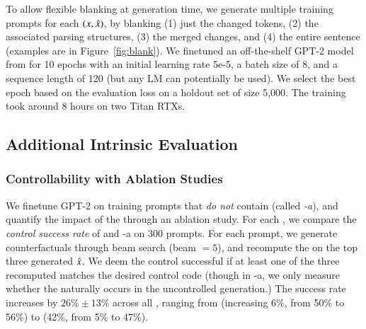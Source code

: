 To allow flexible blanking at generation time, we generate multiple training prompts for each $(x, \hat{x})$, by blanking (1) just the changed tokens, (2) the associated parsing structures, (3) the merged changes, and (4) the entire sentence (examples are in Figure~\ref{fig:blank}).
We finetuned an off-the-shelf GPT-2 model from \citet{Wolf2019HuggingFacesTS} for 10 epochs with an initial learning rate 5e-5, a batch size of 8, and a sequence length of 120 (but any LM can potentially be used).
We select the best epoch based on the evaluation loss on a holdout set of size 5,000.
The training took around 8 hours on two Titan RTXs.


\subsection{Additional Intrinsic Evaluation}
\label{appendix:intrinsic}

\subsubsection{Controllability with Ablation Studies}
\label{appendix:ablation_control}



We finetune GPT-2 on training prompts that \emph{do not} contain \tagstrs (called \emph{\sysname-a}), and quantify the impact of the \tagstrshorts through an ablation study.
For each \tagstr, we compare the \emph{control success rate} of \sysname and \sysname-a on 300 prompts.
For each prompt, we generate counterfactuals through beam search (beam $=5$), and recompute the \tagstrshorts on the top three generated $\hat{x}$.
We deem the control successful if at least one of the three recomputed \tagstrshorts matches the desired control code (though in \sysname-a, we only measure whether the \tagstrshort naturally occurs in the uncontrolled generation.)
The success rate increases by $26\% \pm 13\%$ across all \tagstrs, ranging from  (increasing 6\%, from 50\% to 56\%) to  (42\%, from 5\% to 47\%).


